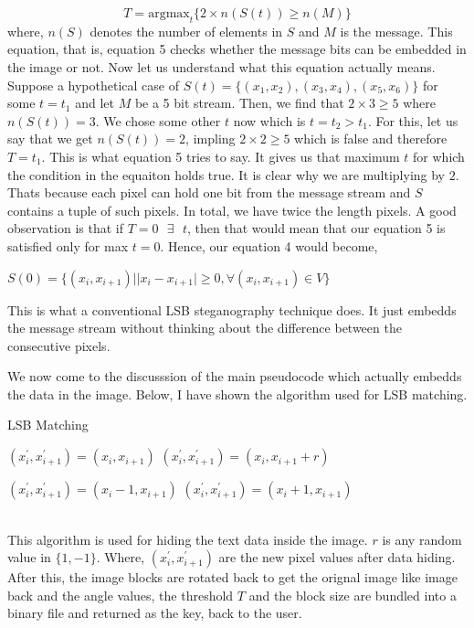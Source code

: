 \documentclass{report}
\begin{document}
\begin{equation}
T = \textrm{argmax}_{t}\{2 \times n(S(t)) \geq n(M)\}
\end{equation}
where, $n(S)$ denotes the number of elements in $S$ and $M$ is the message. This equation, that is, equation 5 checks whether the message bits can be embedded in the image or not. Now let us understand what this equation actually means. Suppose a hypothetical case of $S(t) = \{ (x_{1}, x_{2}), (x_{3}, x_{4}), (x_{5}, x_{6}) \}$ for some $t=t_{1}$ and let $M$ be a 5 bit stream. Then, we find that $2 \times 3 \geq 5$ where $n(S(t)) = 3$. We chose some other $t$ now which is $t=t_{2} > t_{1}$. For this, let us say that we get $n(S(t)) = 2$, impling $2 \times 2 \geq 5$ which is false and therefore $T=t_{1}$. This is what equation 5 tries to say. It gives us that maximum $t$ for which the condition in the equaiton holds true. It is clear why we are multiplying by $2$. Thats because each pixel can hold one bit from the message stream and $S$ contains a tuple of such pixels. In total, we have twice the length pixels.	A good observation is that if $T=0 \textrm{ }\exists \textrm{ }t$, then that would mean that our equation 5 is satisfied only for max $t=0$. Hence, our equation 4 would become,
\begin{center}
$ S(0) = \{(x_{i}, x_{i+1})| |x_{i} - x_{i+1}| \geq 0, \forall (x_{i}, x_{i+1}) \in V \} $
\end{center}
This is what a conventional LSB steganography technique does. It just embedds the message stream without thinking about the difference between the consecutive pixels. \par We now come to the discusssion of the main pseudocode which actually embedds the data in the image. Below, I have shown the algorithm used for LSB matching.
\begin{algorithm}
\caption{LSB Matching}\label{euclid}
\begin{algorithmic}[1]
	\State $(x_{i}^{'}, x_{i+1}^{'}) = (x_{i}, x_{i+1})$ 
	\Else 
	\State $(x_{i}^{'}, x_{i+1}^{'}) = (x_{i}, x_{i+1}+r)$ 
	\EndIf
\EndIf

	\State $(x_{i}^{'}, x_{i+1}^{'}) = (x_{i}-1, x_{i+1})$
	\Else
	\State $(x_{i}^{'}, x_{i+1}^{'}) = (x_{i}+1, x_{i+1})$
	\EndIf
\EndIf
\EndProcedure
\end{algorithmic}
\end{algorithm}
\\ This algorithm is used for hiding the text data inside the image. $r$ is any random value in $\{ 1, -1\}$. Where, $(x_{i}^{'}, x_{i+1}^{'})$ are the new pixel values after data hiding. After this, the image blocks are rotated back to get the orignal image like image back and the angle values, the threshold $T$ and the block size are bundled into a binary file and returned as the key, back to the user. \newpage
\end{document}
